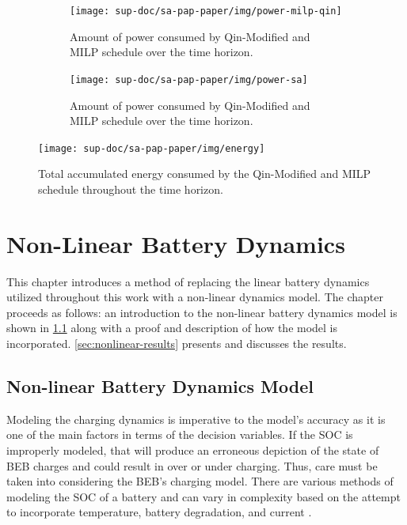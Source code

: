 \documentclass[ee,thesis]{usuthesis}
\begin{document}
\begin{figure}
  \begin{subfigure}[t]{\textwidth}
    \centering
    \texttt{[image: sup-doc/sa-pap-paper/img/power-milp-qin]}
    \caption{Amount of power consumed by Qin-Modified and MILP schedule over the time horizon.}
    \label{fig:power-usage-milp-qin}
  \end{subfigure}

  \hfill

  \begin{subfigure}[t]{\textwidth}
    \centering
    \texttt{[image: sup-doc/sa-pap-paper/img/power-sa]}
    \caption{Amount of power consumed by Qin-Modified and MILP schedule over the time horizon.}
    \label{fig:power-usage-sa}
  \end{subfigure}
  \caption{}
  \label{fig:power}
\end{figure}

\begin{figure}[htpb]
\centering \texttt{[image: sup-doc/sa-pap-paper/img/energy]}
    \caption{Total accumulated energy consumed by the Qin-Modified and MILP schedule throughout the time horizon.}
    \label{fig:energy-usage}
\end{figure}

\chapter{Non-Linear Battery Dynamics}
\label{sec:nonlinear-battery-dynamics}
This chapter introduces a method of replacing the linear battery dynamics utilized throughout this work with a
non-linear dynamics model. The chapter proceeds as follows: an introduction to the non-linear battery dynamics model is
shown in \ref{sec:nonlinear-model} along with a proof and description of how the model is incorporated.
\ref{sec:nonlinear-results} presents and discusses the results.

\section{Non-linear Battery Dynamics Model}
\label{sec:nonlinear-model}
Modeling the charging dynamics is imperative to the model's accuracy as it is one of the main factors in terms of the
decision variables. If the SOC is improperly modeled, that will produce an erroneous depiction of the state of BEB
charges and could result in over or under charging. Thus, care must be taken into considering the BEB's charging model.
There are various methods of modeling the SOC of a battery and can vary in complexity based on the attempt to
incorporate temperature, battery degradation, and current
\cite{zhang-2021-optim-elect,chen-2008-desig-grey,watrin-2012-multip-lithium}.
\end{document}

